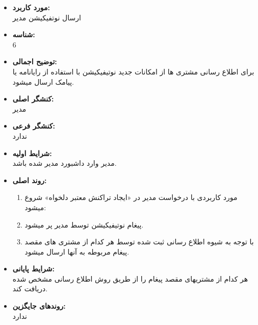 \documentclass{article}
\begin{document}
\begin{itemize}
\item \textbf{مورد کاربرد:}\\
ارسال نوتفیکیشن مدیر
\item \textbf{شناسه:}\\
6
\item \textbf{توضیح اجمالی:}\\
برای اطلاع رسانی مشتری ها از امکانات جدید نوتیفیکیشن با استفاده از رایانامه یا پیامک ارسال میشود.
\item \textbf{کنشگر اصلی:}\\
مدیر
\item \textbf{کنشگر فرعی:}\\
ندارد
\item \textbf{شرایط اولیه:}\\
مدیر وارد داشبورد مدیر شده باشد.
\item \textbf{روند اصلی:}\\
\begin{enumerate}
\item مورد کاربردی با درخواست مدیر در «ایجاد تراکنش معتبر دلخواه» شروع میشود: 
\item پیغام نوتیفیکیشن توسط مدیر پر میشود.
\item با توجه به شیوه اطلاع رسانی ثبت شده توسط هر کدام از مشتری های مقصد پیغام مربوطه به آنها ارسال میشود.
\end{enumerate}

\item \textbf{شرایط پایانی:}\\ 
هر کدام از مشتریهای مقصد پیغام را از طریق روش اطلاع رسانی مشخص شده دریافت کند.
\item \textbf{روندهای جایگزین:}\\
ندارد
\end{itemize}
\noindent\makebox[\linewidth]{\rule{\paperwidth}{0.4pt}}
\end{document}
